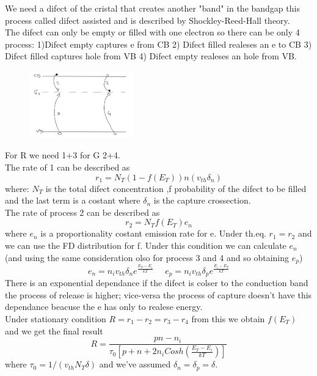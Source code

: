 We need a difect of the cristal that creates another "band" in the bandgap this process called difect assisted and is described by Shockley-Reed-Hall theory.\\
The difect can only be empty or filled with one electron so there can be only 4 process: 1)Difect empty captures e from CB   2) Difect filled realeses an e to CB 3) Difect filled captures hole from VB 4) Difect empty realeses an hole from VB.

\begin{figure}
\includegraphics[width=0.4\textwidth]{srhp2.png}
\end{figure}

For R we need 1+3 for G 2+4.\\
The rate of 1 can be described as 
\begin{equation}
r_1=N_T(1-f(E_T))n(v_{th} \delta_n)
\end{equation}
where: $N_T$ is the total difect concentration ,f probability of the difect to be filled and the last term is a costant where $\delta_n$ is the capture crossection.\\
The rate of process 2 can be described as 
\begin{equation}
r_2=N_Tf(E_T)e_n
\end{equation}
where $e_n$ is a proportionality costant emission rate for e.
Under th.eq. $r_1=r_2$ and we can use the FD distribution for f. Under this condition we can calculate $e_n$ (and using the same consideration olso for process 3 and 4 and so obtaining $e_p$)
\begin{equation}
e_n=n_iv_{th}\delta_ne^{\frac{E_T-E_i}{kT}} \ \ \ \ \ \ e_p=n_iv_{th}\delta_pe^{\frac{E_i-E_T}{kT}}
\end{equation}
There is an exponential dependance if the difect is colser to the conduction band the process of release is higher; vice-versa the process of capture doesn't have this dependance beacuse the e has only to realese energy.\\
Under stationary condition $R=r_1-r_2=r_3-r_4$ from this we obtain $f(E_T)$ and we get the final result 
\begin{equation}
R=\frac{pn-n_i}{\tau_0\left[p+n+2n_iCosh(\frac{E_T-E_i}{kT})\right]}
\end{equation}
where $\tau_0=1/(v_{th}N_T\delta)$ and we've assumed $\delta_n=\delta_p=\delta$.\\

